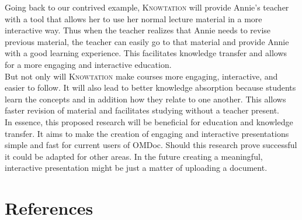 \documentclass[twoside]{article}
\newcommand{\sys}{\textsc{Knowtation}\xspace}
\begin{document}
Going back to our contrived example, \sys will provide Annie's teacher with a tool that allows her to use her normal lecture material in a more interactive way. Thus when the teacher realizes that Annie needs to revise previous material, the teacher can easily go to that material and provide Annie with a good learning experience. This facilitates knowledge transfer and allows for a more engaging and interactive education.\\

But not only will \sys make courses more engaging, interactive, and easier to follow. It will also lead to better knowledge absorption because students learn the concepts and in addition how they relate to one another. This allows faster revision of material and facilitates studying without a teacher present. \\

In essence, this proposed research will be beneficial for education and knowledge transfer. It aims to make the creation of engaging and interactive presentations simple and fast for current users of OMDoc. Should this research prove successful it could be adapted for other areas. In the future creating a meaningful, interactive presentation might be just a matter of uploading a document.

\newpage
\section{References}

{}

\end{document}
